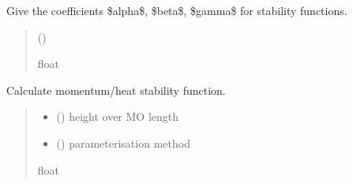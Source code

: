 \documentclass[letterpaper,10pt,english]{sphinxmanual}
\begin{document}
\begin{fulllineitems}
\label{\detokenize{users_guide:AirSeaFluxCode.flux_subs.stratification.get_stabco}}
\pysigstartsignatures
\pysiglinewithargsret
{}
{}
{}
\pysigstopsignatures
\sphinxAtStartPar
Give the coefficients \$alpha\$, \$beta\$, \$gamma\$ for stability functions.
\begin{quote}\begin{description}
\sphinxAtStartPar
{} ()

\sphinxAtStartPar
{}

\sphinxAtStartPar
float

\end{description}\end{quote}

\end{fulllineitems}


\begin{fulllineitems}
\label{\detokenize{users_guide:AirSeaFluxCode.flux_subs.stratification.psi_Bel}}
\pysigstartsignatures
\pysiglinewithargsret
{}
{}
{}
\pysigstopsignatures
\sphinxAtStartPar
Calculate momentum/heat stability function.
\begin{quote}\begin{description}
\begin{itemize}
\item {}
\sphinxAtStartPar
{} () \textendash{} height over MO length

\item {}
\sphinxAtStartPar
{} () \textendash{} parameterisation method

\end{itemize}

\sphinxAtStartPar
{}

\sphinxAtStartPar
float

\end{description}\end{quote}

\end{fulllineitems}
\end{document}
